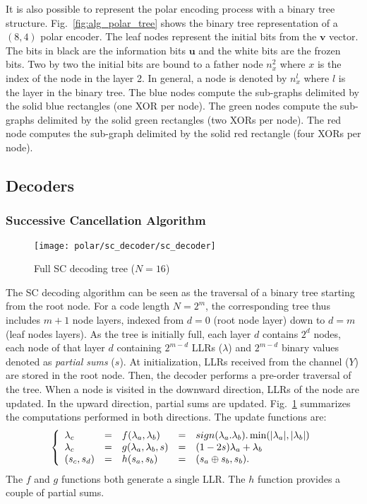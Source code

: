 It is also possible to represent the polar encoding process with a binary tree
structure. Fig.~\ref{fig:alg_polar_tree} shows the binary tree representation of
a $(8,4)$ polar encoder. The leaf nodes represent the initial bits from the
$\bm{v}$ vector. The bits in black are the information bits $\bm{u}$ and the
white bits are the frozen bits. Two by two the initial bits are bound to a
father node $n_x^2$ where $x$ is the index of the node in the layer 2. In
general, a node is denoted by $n_x^l$ where $l$ is the layer in the binary tree.
The {\color{Paired-1} blue} nodes compute the sub-graphs delimited by the solid
{\color{Paired-1} blue} rectangles (one XOR per node). The {\color{Paired-3}
green} nodes compute the sub-graphs delimited by the solid {\color{Paired-3}
green} rectangles (two XORs per node). The {\color{Paired-5} red} node computes
the sub-graph delimited by the solid {\color{Paired-5} red} rectangle (four XORs
per node).

\subsection{Decoders}

\subsubsection{Successive Cancellation Algorithm}

\begin{figure}[htp]
  \centering
  \texttt{[image: polar/sc\_decoder/sc\_decoder]}
  \caption{Full SC decoding tree ($N = 16$)}
  \label{fig:polar_sc_decoder}
\end{figure}

The SC decoding algorithm can be seen as the traversal of a binary tree starting
from the root node. For a code length $N=2^m$, the corresponding tree thus
includes $m + 1$ node layers, indexed from $d=0$ (root node layer) down to
$d=m$ (leaf nodes layers). As the tree is initially full, each layer $d$
contains $2^d$ nodes, each node of that layer $d$  containing $2^{m-d}$ LLRs
($\lambda$) and $2^{m-d}$ binary values denoted as \textit{partial sums} ($s$).
At initialization, LLRs received  from the channel ($Y$) are stored in the root
node. Then, the decoder performs a pre-order traversal of the tree. When a node
is visited in the downward direction, LLRs of the node are updated. In the
upward direction, partial sums are updated. Fig.~\ref{fig:polar_sc_decoder}
summarizes the computations performed in both directions. The update functions
are:
\begin{eqnarray}
\left\{\begin{array}{l c l c l}
\lambda_c &=& f(\lambda_a,\lambda_b) &=& sign(\lambda_a.\lambda_b).\min(|\lambda_a|,|\lambda_b|)\\
\lambda_c &=& g(\lambda_a,\lambda_b,s)&=&(1-2s)\lambda_a+\lambda_b\\
(s_{c}, s_{d}) &=& h(s_{a}, s_{b}) &=& (s_{a} \oplus s_{b}, s_{b}).
\end{array}\right.
\label{eq:polar_f_g_h}
\end{eqnarray}
The $f$ and $g$ functions both generate a single LLR. The $h$ function provides
a couple of partial sums.

